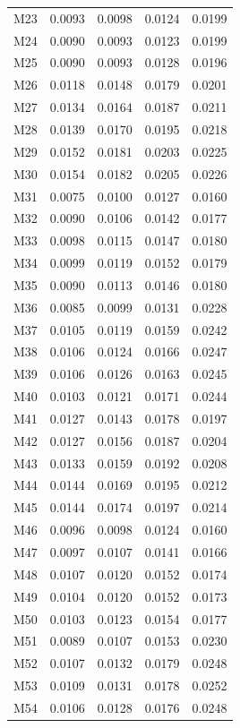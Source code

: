 \begin{longtable}{lrrrr}
M23 & 0.0093 & 0.0098 & 0.0124 & 0.0199 \\
M24 & 0.0090 & 0.0093 & 0.0123 & 0.0199 \\
M25 & 0.0090 & 0.0093 & 0.0128 & 0.0196 \\
M26 & 0.0118 & 0.0148 & 0.0179 & 0.0201 \\
M27 & 0.0134 & 0.0164 & 0.0187 & 0.0211 \\
M28 & 0.0139 & 0.0170 & 0.0195 & 0.0218 \\
M29 & 0.0152 & 0.0181 & 0.0203 & 0.0225 \\
M30 & 0.0154 & 0.0182 & 0.0205 & 0.0226 \\
M31 & 0.0075 & 0.0100 & 0.0127 & 0.0160 \\
M32 & 0.0090 & 0.0106 & 0.0142 & 0.0177 \\
M33 & 0.0098 & 0.0115 & 0.0147 & 0.0180 \\
M34 & 0.0099 & 0.0119 & 0.0152 & 0.0179 \\
M35 & 0.0090 & 0.0113 & 0.0146 & 0.0180 \\
M36 & 0.0085 & 0.0099 & 0.0131 & 0.0228 \\
M37 & 0.0105 & 0.0119 & 0.0159 & 0.0242 \\
M38 & 0.0106 & 0.0124 & 0.0166 & 0.0247 \\
M39 & 0.0106 & 0.0126 & 0.0163 & 0.0245 \\
M40 & 0.0103 & 0.0121 & 0.0171 & 0.0244 \\
M41 & 0.0127 & 0.0143 & 0.0178 & 0.0197 \\
M42 & 0.0127 & 0.0156 & 0.0187 & 0.0204 \\
M43 & 0.0133 & 0.0159 & 0.0192 & 0.0208 \\
M44 & 0.0144 & 0.0169 & 0.0195 & 0.0212 \\
M45 & 0.0144 & 0.0174 & 0.0197 & 0.0214 \\
M46 & 0.0096 & 0.0098 & 0.0124 & 0.0160 \\
M47 & 0.0097 & 0.0107 & 0.0141 & 0.0166 \\
M48 & 0.0107 & 0.0120 & 0.0152 & 0.0174 \\
M49 & 0.0104 & 0.0120 & 0.0152 & 0.0173 \\
M50 & 0.0103 & 0.0123 & 0.0154 & 0.0177 \\
M51 & 0.0089 & 0.0107 & 0.0153 & 0.0230 \\
M52 & 0.0107 & 0.0132 & 0.0179 & 0.0248 \\
M53 & 0.0109 & 0.0131 & 0.0178 & 0.0252 \\
M54 & 0.0106 & 0.0128 & 0.0176 & 0.0248 \\

\end{longtable}
